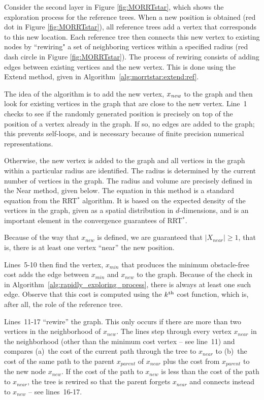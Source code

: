 \documentclass{article}
\begin{document}
Consider the second layer in Figure \ref{fig:MORRTstar}, which shows the exploration process for the reference trees.
When a new position is obtained (red dot in Figure \ref{fig:MORRTstar}), all reference trees add a vertex that corresponds to this new location.  
Each reference tree then connects this new vertex to existing nodes by ``rewiring" a set of neighboring vertices within a specified radius (red dash circle in Figure \ref{fig:MORRTstar}).  
The process of rewiring consists of adding edges between existing vertices and the new vertex.  This is done using the {\sc Extend} method, given in Algorithm~\ref{alg:morrtstar:extend:ref}.

The idea of the algorithm is to add the new vertex, $x_{\it new}$ to the graph and then look for existing vertices in the graph that are close to the new vertex. 
Line~1 checks to see if the randomly generated position is precisely on top of the position of a vertex already in the graph.  
If so, no edges are added to the graph; this prevents self-loops, and is necessary because of finite precision numerical representations.  

Otherwise, the new vertex is added to the graph and all vertices in the graph within a particular radius are identified.  
The radius is determined by the current number of vertices in the graph. 
The radius and volume are precisely defined in the {\sc Near} method, given below. The equation in this method is a standard equation from the RRT$^{*}$ algorithm.  It is based on the expected density of the vertices in the graph, given as a spatial distribution in $d$-dimensions, and is an important element in the convergence guarantees of RRT$^{*}$.

Because of the way that $x_{new}$ is defined, we are guaranteed that $|X_{near}| \geq 1$, that is, there is at least one vertex ``near'' the new position.

Lines~5-10 then find the vertex, $x_{min}$ that produces the minimum obstacle-free cost adds the edge between $x_{min}$ and $x_{new}$ to the graph.  
Because of the check in in Algorithm~\ref{alg:rapidly_exploring_process}, there is always at least one such edge.  
Observe that this cost is computed using the $k^{\rm th}$ cost function, which is, after all, the role of the reference tree.

Lines~11-17 ``rewire'' the graph.  
This only occurs if there are more than two vertices in the neighborhood of $x_{new}$.  
The lines step through every vertex $x_{near}$ in the neighborhood (other than the minimum cost vertex -- see line~11) and compares (a)~the cost of the current path through the tree to $x_{near}$ to (b)~the cost of the same path to the parent $x_{parent}$ of $x_{near}$ plus the cost from $x_{parent}$ to the new node $x_{new}$. 
If the cost of the path to $x_{new}$ is less than the cost of the path to $x_{near}$, the tree is rewired so that the parent forgets $x_{near}$ and connects instead to $x_{new}$ -- see lines~16-17.
\end{document}
